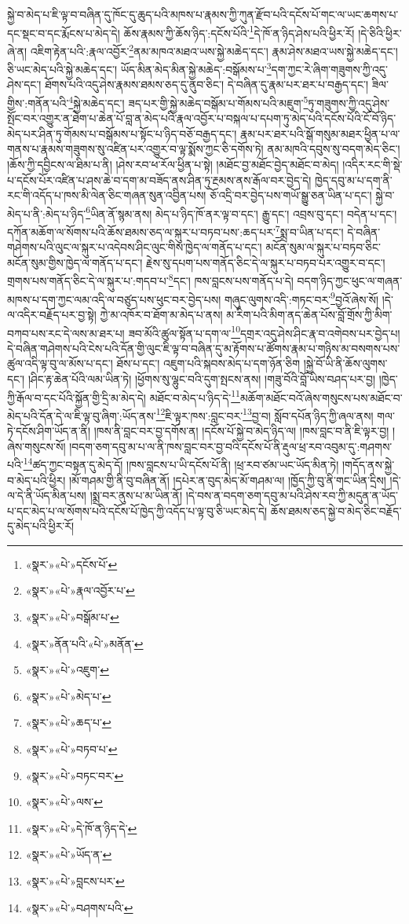 སྐྱེ་བ་མེད་པ་ཇི་ལྟ་བ་བཞིན་དུ་ཁོང་དུ་ཆུད་པའི་མཁས་པ་རྣམས་ཀྱི་ཀུན་རྫོབ་པའི་དངོས་པོ་གང་ལ་ཡང་ཆགས་པ་དང་སྡང་བ་དང་རྨོངས་པ་མེད་དེ། ཆོས་རྣམས་ཀྱི་ཆོས་ཉིད་:དངོས་པོའི་\footnote{«སྣར་»«པེ་»དངོས་པོ་}དེ་ཁོ་ན་ཉིད་ཤེས་པའི་ཕྱིར་རོ། །དེ་ཅིའི་ཕྱིར་ཞེ་ན། འཇིག་རྟེན་པའི་:རྣལ་འབྱོར་\footnote{«སྣར་»«པེ་»རྣལ་འབྱོར་པ་}ནམ་མཁའ་མཐའ་ཡས་སྐྱེ་མཆེད་དང་། རྣམ་ཤེས་མཐའ་ཡས་སྐྱེ་མཆེད་དང་། ཅི་ཡང་མེད་པའི་སྐྱེ་མཆེད་དང་། ཡོད་མིན་མེད་མིན་སྐྱེ་མཆེད་:བསྒོམས་པ་\footnote{«སྣར་»«པེ་»བསྒོམ་པ་}དག་ཀྱང་རེ་ཞིག་གཟུགས་ཀྱི་འདུ་ཤེས་དང་། ཐོགས་པའི་འདུ་ཤེས་རྣམས་ཐམས་ཅད་དུ་ནུབ་ཅིང་། དེ་བཞིན་དུ་རྣམ་པར་ཐར་པ་བརྒྱད་དང་། ཟིལ་གྱིས་:གནོན་པའི་\footnote{«སྣར་»ནོན་པའི་«པེ་»མནོན་}སྐྱེ་མཆེད་དང་། ཟད་པར་གྱི་སྐྱེ་མཆེད་བསྒོམ་པ་གོམས་པའི་མཇུག་\footnote{«སྣར་»«པེ་»འཇུག་}ཏུ་གཟུགས་ཀྱི་འདུ་ཤེས་སྤོང་བར་འགྱུར་ན་ཐེག་པ་ཆེན་པོ་བླ་ན་མེད་པའི་རྣལ་འབྱོར་པ་བསྐལ་པ་དཔག་ཏུ་མེད་པའི་དངོས་པོའི་ངོ་བོ་ཉིད་མེད་པར་ཤིན་ཏུ་གོམས་པ་བསྒོམས་པ་སྟོང་པ་ཉིད་བཅོ་བརྒྱད་དང་། རྣམ་པར་ཐར་པའི་སྒོ་གསུམ་མཐར་ཕྱིན་པ་ལ་གནས་པ་རྣམས་གཟུགས་སུ་འཛིན་པར་འགྱུར་བ་ལྟ་སྨོས་ཀྱང་ཅི་དགོས་ཏེ། ནམ་མཁའི་དབུས་སུ་བདག་མེད་ཅིང་། །ཆོས་ཀྱི་དབྱིངས་ལ་ཐིམ་པ་ནི། །ཤེས་རབ་ཕ་རོལ་ཕྱིན་པ་སྟེ། །མཐོང་བྱ་མཐོང་བྱེད་མཐོང་བ་མེད། །འདིར་རང་གི་སྡེ་པ་དངོས་པོར་འཛིན་པ་ཤས་ཆེ་བ་དག་མ་བཟོད་ནས་ཤིན་ཏུ་རྔམས་ནས་རྒོལ་བར་བྱེད་དེ། ཁྱེད་དབུ་མ་པ་དག་ནི་རང་གི་འདོད་པ་ཁས་མི་ལེན་ཅིང་གཞན་སུན་འབྱིན་པས། ཅོ་འདྲི་བར་བྱེད་པས་གཡོ་སྒྱུ་ཅན་ཡིན་པ་དང་། སྐྱེ་བ་མེད་པ་ནི་:མེད་པ་ཉིད་\footnote{«སྣར་»«པེ་»མེད་པ་}ཡིན་ནོ་སྙམ་ནས། མེད་པ་ཉིད་ཁོ་ནར་ལྟ་བ་དང་། རྒྱུ་དང་། འབྲས་བུ་དང་། བདེན་པ་དང་། དཀོན་མཆོག་ལ་སོགས་པའི་ཆོས་ཐམས་ཅད་ལ་སྐུར་པ་བཏབ་པས་:ཆད་པར་\footnote{«སྣར་»«པེ་»ཆད་པ་}སྨྲ་བ་ཡིན་པ་དང་། དེ་བཞིན་གཤེགས་པའི་ལུང་ལ་སྐུར་པ་འདེབས་ཤིང་ལུང་གིས་ཁྱེད་ལ་གནོད་པ་དང་། མངོན་སུམ་ལ་སྐུར་པ་བཏབ་ཅིང་མངོན་སུམ་གྱིས་ཁྱེད་ལ་གནོད་པ་དང་། རྗེས་སུ་དཔག་པས་གནོད་ཅིང་དེ་ལ་སྐུར་པ་བཏབ་པར་འགྱུར་བ་དང་། གྲགས་པས་གནོད་ཅིང་དེ་ལ་སྐུར་པ་:གདབ་པ་\footnote{«སྣར་»«པེ་»བཏབ་པ་}དང་། ཁས་བླངས་པས་གནོད་པ་དེ། བདག་ཉིད་ཀྱང་ཕུང་ལ་གཞན་མཁས་པ་དག་ཀྱང་ལམ་འདི་ལ་བཙུད་པས་ཕུང་བར་བྱེད་པས། གཞུང་ལུགས་འདི་:གཏང་བར་\footnote{«སྣར་»«པེ་»བཏང་བར་}བྱའོ་ཞེས་སོ། །དེ་ལ་འདིར་བརྗོད་པར་བྱ་སྟེ། ཀྱེ་མ་འཁོར་བ་ཐོག་མ་མེད་པ་ནས། མ་རིག་པའི་མིག་ནད་ཆེན་པོས་བློ་གྲོས་ཀྱི་མིག་བཀབ་པས་རང་དེ་ལས་མ་ཐར་པ། ཟབ་མོའི་ཚུལ་སྟོན་པ་དག་ལ་\footnote{«སྣར་»«པེ་»ལས་}དགྲར་འདུ་ཤེས་ཤིང་རྣ་བ་འགེབས་པར་བྱེད་པ། དེ་བཞིན་གཤེགས་པའི་ངེས་པའི་དོན་གྱི་ལུང་ཇི་ལྟ་བ་བཞིན་དུ་མ་རྟོགས་པ་ཚོགས་རྣམ་པ་གཉིས་མ་བསགས་པས་ཚུལ་འདི་ལྟ་བུ་ལ་མོས་པ་དང་། ཐོས་པ་དང་། འཇུག་པའི་སྐབས་མེད་པ་དག་ཉོན་ཅིག །སྐྱེ་བོ་ཡི་ནི་ཆོས་ལུགས་དང་། །ཤིང་རྟ་ཆེན་པོའི་ལམ་ཡིན་ཏེ། །ཕྱོགས་སུ་ལྷུང་བའི་དུག་སྤངས་ནས། །གཟུ་བོའི་བློ་ཡིས་བཤད་པར་བྱ། །ཁྱེད་ཀྱི་རྒོལ་བ་དང་པོའི་སྐྱོན་གྱི་དྲི་མ་མེད་དེ། མཐོང་བ་མེད་པ་ཉིད་དེ་\footnote{«སྣར་»«པེ་»དེ་ཁོ་ན་ཉིད་དེ་}མཆོག་མཐོང་བའོ་ཞེས་གསུངས་པས་མཐོང་བ་མེད་པའི་དོན་དེ་ལ་ཇི་ལྟ་བུ་ཞིག་:ཡོད་ནས་\footnote{«སྣར་»«པེ་»ཡོད་ན་}ཇི་ལྟར་ཁས་:བླང་བར་\footnote{«སྣར་»«པེ་»བླངས་པར་}བྱ་བ། སློབ་དཔོན་ཉིད་ཀྱི་ཞལ་ནས། གལ་ཏེ་དངོས་ཤིག་ཡོད་ན་ནི། །ཁས་ནི་བླང་བར་བྱ་དགོས་ན། །དངོས་པོ་སྐྱེ་བ་མེད་ཉིད་ལ། །ཁས་བླང་བ་ནི་ཇི་ལྟར་བྱ། །ཞེས་གསུངས་སོ། །བདག་ཅག་དབུ་མ་པ་ལ་ནི་ཁས་བླང་བར་བྱ་བའི་དངོས་པོ་ནི་རྡུལ་ཕྲ་རབ་འབུམ་དུ་:གཤགས་པའི་\footnote{«སྣར་»«པེ་»བཤགས་པའི་}ཚད་ཀྱང་བསྟན་དུ་མེད་དོ། །ཁས་བླངས་པ་ཡི་དངོས་པོ་ནི། །ཕྲ་རབ་ཙམ་ཡང་ཡོད་མིན་ཏེ། །གདོད་ནས་སྐྱེ་བ་མེད་པའི་ཕྱིར། །མོ་གཤམ་གྱི་ནི་བུ་བཞིན་ནོ། །དཔེར་ན་བུད་མེད་མོ་གཤམ་ལ། །ཁྱོད་ཀྱི་བུ་ནི་གང་ཡིན་དྲིས། །དེ་ལ་དེ་ནི་ཡོད་མིན་པས། །སྨྲ་བར་ནུས་པ་མ་ཡིན་ནོ། །དེ་བས་ན་བདག་ཅག་དབུ་མ་པའི་ཤེས་རབ་ཀྱི་མདུན་ན་ཡོད་པ་དང་མེད་པ་ལ་སོགས་པའི་དངོས་པོ་ཁྱེད་ཀྱི་འདོད་པ་ལྟ་བུ་ཅི་ཡང་མེད་དེ། ཆོས་ཐམས་ཅད་སྐྱེ་བ་མེད་ཅིང་བརྗོད་དུ་མེད་པའི་ཕྱིར་རོ། 